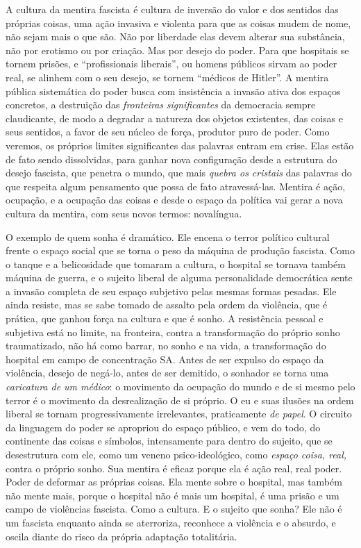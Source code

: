 A cultura da mentira fascista é cultura de inversão do valor e dos
sentidos das próprias coisas, uma ação invasiva e violenta para que as
coisas mudem de nome, não sejam mais o que são. Não por liberdade elas
devem alterar sua substância, não por erotismo ou por criação. Mas por
desejo do poder. Para que hospitais se tornem prisões, e ``profissionais
liberais'', ou homens públicos sirvam ao poder real, se alinhem com o
seu desejo, se tornem ``médicos de Hitler''. A mentira pública
sistemática do poder busca com insistência a invasão ativa dos espaços
concretos, a destruição das \emph{fronteiras} \emph{significantes} da
democracia sempre claudicante, de modo a degradar a natureza dos objetos
existentes, das coisas e seus sentidos, a favor de seu núcleo de força,
produtor puro de poder. Como veremos, os próprios limites significantes
das palavras entram em crise. Elas estão de fato sendo dissolvidas, para
ganhar nova configuração desde a estrutura do desejo fascista, que
penetra o mundo, que mais \emph{quebra os cristais} das palavras do que
respeita algum pensamento que possa de fato atravessá-las. Mentira é
ação, ocupação, e a ocupação das coisas e desde o espaço da política vai
gerar a nova cultura da mentira, com seus novos termos: novalíngua.

O exemplo de quem sonha é dramático. Ele encena o terror político
cultural frente o espaço social que se torna o peso da máquina de
produção fascista. Como o tanque e a belicosidade que tomaram a cultura,
o hospital se tornava também máquina de guerra, e o sujeito liberal de
alguma personalidade democrática sente a invasão completa de seu espaço
subjetivo pelas mesmas formas pesadas. Ele ainda resiste, mas se sabe
tomado de assalto pela ordem da violência, que é prática, que ganhou
força na cultura e que é sonho. A resistência pessoal e subjetiva está
no limite, na fronteira, contra a transformação do próprio sonho
traumatizado, não há como barrar, no sonho e na vida, a transformação do
hospital em campo de concentração SA. Antes de ser expulso do espaço da
violência, desejo de negá-lo, antes de ser demitido, o sonhador se torna
uma \emph{caricatura de um médico}: o movimento da ocupação do mundo e
de si mesmo pelo terror é o movimento da desrealização de si próprio. O
eu e suas ilusões na ordem liberal se tornam progressivamente
irrelevantes, praticamente \emph{de papel}. O circuito da linguagem do
poder se apropriou do espaço público, e vem do todo, do continente das
coisas e símbolos, intensamente para dentro do sujeito, que se
desestrutura com ele, como um veneno psico-ideológico, como \emph{espaço
coisa, real,} contra o próprio sonho. Sua mentira é eficaz porque ela é
ação real, real poder. Poder de deformar as próprias coisas. Ela mente
sobre o hospital, mas também não mente mais, porque o hospital não é
mais um hospital, é uma prisão e um campo de violências fascista. Como a
cultura. E o sujeito que sonha? Ele não é um fascista enquanto ainda se
aterroriza, reconhece a violência e o absurdo, e oscila diante do risco
da própria adaptação totalitária.

